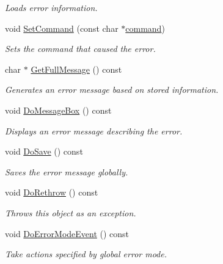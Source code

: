 \begin{DoxyCompactItemize}
\begin{DoxyCompactList}\small\item\em Loads error information. \item\end{DoxyCompactList}\item 
void \hyperlink{class_error_report_aea45480d94e0df46effe801e68c7ac2c}{SetCommand} (const char $\ast$\hyperlink{class_error_report_a3924c0754aef927067733907ba12409e}{command})
\begin{DoxyCompactList}\small\item\em Sets the command that caused the error. \item\end{DoxyCompactList}\item 
char $\ast$ \hyperlink{class_error_report_aa36db420236ce44c4bbf52a0c37d1e21}{GetFullMessage} () const 
\begin{DoxyCompactList}\small\item\em Generates an error message based on stored information. \item\end{DoxyCompactList}\item 
\hypertarget{class_error_report_a0cd96bd46b77f20d1fbc4e8ae37d5bee}{
void \hyperlink{class_error_report_a0cd96bd46b77f20d1fbc4e8ae37d5bee}{DoMessageBox} () const }
\label{class_error_report_a0cd96bd46b77f20d1fbc4e8ae37d5bee}

\begin{DoxyCompactList}\small\item\em Displays an error message describing the error. \item\end{DoxyCompactList}\item 
\hypertarget{class_error_report_ad70ccb3274419ede588d3d93ca6ff0e4}{
void \hyperlink{class_error_report_ad70ccb3274419ede588d3d93ca6ff0e4}{DoSave} () const }
\label{class_error_report_ad70ccb3274419ede588d3d93ca6ff0e4}

\begin{DoxyCompactList}\small\item\em Saves the error message globally. \item\end{DoxyCompactList}\item 
void \hyperlink{class_error_report_a78c48f3b3fee98c5f74b6b7310f6b2ee}{DoRethrow} () const 
\begin{DoxyCompactList}\small\item\em Throws this object as an exception. \item\end{DoxyCompactList}\item 
void \hyperlink{class_error_report_a98ced37160867d523806273b1b6f8b01}{DoErrorModeEvent} () const 
\begin{DoxyCompactList}\small\item\em Take actions specified by global error mode. \item\end{DoxyCompactList}\end{DoxyCompactItemize}
